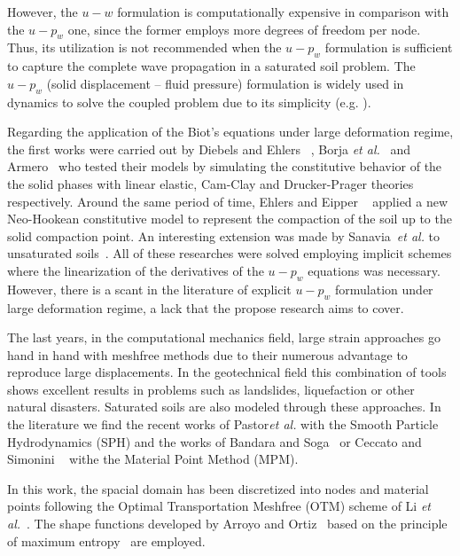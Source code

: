 \documentclass[twocolumn]{svjour3}          %
\begin{document}
However, the $u-w$ formulation is computationally expensive in comparison with the $u-p_w$ one, since the former employs more degrees of freedom per node. Thus, its utilization is not recommended when the $u-p_w$ formulation is sufficient to capture the complete wave propagation in a saturated soil problem. 
The $u-p_w$ (solid displacement -- fluid pressure) formulation is widely used in dynamics to solve the coupled problem due to its simplicity (e.g. \cite{CaoSanavia:16,zienkiewicz1990a,Zienkiewicz99}). 

Regarding the application of the Biot's equations under large deformation regime, the first works were  carried out by Diebels and Ehlers ~\cite{DiebelsE:96}, Borja \textit{et al.}~\cite{borja95,borja98} and Armero~\cite{Armero99} who tested their models by simulating the constitutive behavior of the the solid phases with linear elastic, Cam-Clay and Drucker-Prager theories respectively.  Around the same period of time, Ehlers and Eipper ~\cite{Ehlers:99} applied a new Neo-Hookean constitutive model to represent the compaction of the soil up to the solid compaction point. An interesting extension was made by Sanavia~\textit{et al.} to unsaturated soils~\cite{Sanavia:01, Sanavia:02}. All of these researches were solved employing implicit schemes where the linearization of the derivatives of the $u-p_w$ equations was necessary.  However, there is a scant in the literature of explicit $u-p_w$ formulation under large deformation regime, a lack that the propose research aims to cover.

The last years, in the computational mechanics field, large strain approaches go hand in hand with meshfree methods due to their numerous advantage to reproduce large displacements. In the geotechnical field this combination of tools shows excellent results in problems such as landslides, liquefaction or other natural disasters. Saturated soils are also modeled through these approaches. In the literature we find the recent works of Pastor{\it et al.} with the Smooth Particle Hydrodynamics (SPH) and the works of Bandara and Soga~\cite{Bandara2016a} or Ceccato and Simonini ~\cite{Ceccato:16} withe the Material Point Method (MPM).

In this work, the  spacial domain has been discretized into nodes and material points following the Optimal Transportation Meshfree (OTM) scheme of Li {\it et al.}~\cite{li2010}. The shape functions developed by Arroyo and Ortiz~\cite{arroyo2006} based on the principle of maximum entropy~\cite{Sukumar2004} are employed. 
\end{document}
